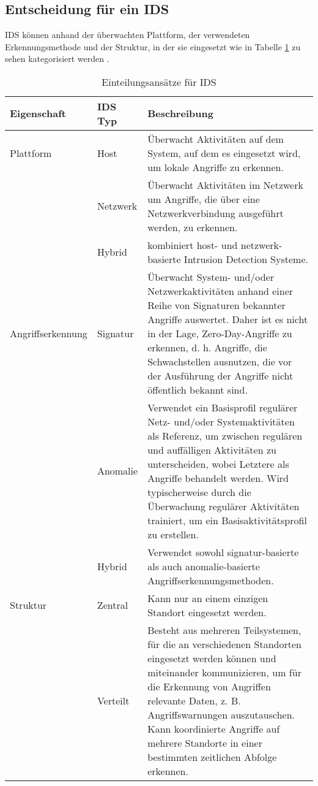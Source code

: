 \subsection{Entscheidung für ein IDS}
IDS können anhand der überwachten Plattform, der verwendeten Erkennungsmethode und der Struktur, in der sie eingesetzt wie in Tabelle \ref{Tabelle_1} zu sehen kategorisiert werden \cite{milenkoski_evaluating_2015}.
\begin{table}[H]
\label{Tabelle_1}
\caption{Einteilungsansätze für IDS}
\begin{tabularx}{\columnwidth}{p{3cm} l p{10cm}}
\toprule
Eigenschaft 
& IDS Typ 
& Beschreibung\\
\midrule
Plattform   
& Host     
& Überwacht Aktivitäten auf dem System, auf dem es eingesetzt wird, um lokale Angriffe zu erkennen.\\\addlinespace[0.5em]
& Netzwerk 
& Überwacht Aktivitäten im Netzwerk um Angriffe, die über eine Netzwerkverbindung ausgeführt werden, zu erkennen.\\ 
& Hybrid   
& kombiniert host- und netzwerk-basierte Intrusion Detection Systeme.\\
\midrule
Angriffserkennung 
& Signatur        
& Überwacht System- und/oder Netzwerkaktivitäten anhand einer Reihe von Signaturen bekannter Angriffe auswertet. Daher ist es nicht in der Lage, Zero-Day-Angriffe zu erkennen, d. h. Angriffe, die Schwachstellen ausnutzen, die vor der Ausführung der Angriffe nicht öffentlich bekannt sind.\\\addlinespace[0.5em]
& Anomalie        
& Verwendet ein Basisprofil regulärer Netz- und/oder Systemaktivitäten als Referenz, um zwischen regulären und auffälligen Aktivitäten zu unterscheiden, wobei Letztere als Angriffe behandelt werden. Wird typischerweise durch die Überwachung regulärer Aktivitäten trainiert, um ein Basisaktivitätsprofil zu erstellen.\\\addlinespace[0.5em]
& Hybrid          
& Verwendet sowohl signatur-basierte als auch anomalie-basierte Angriffserkennungsmethoden.\\ 
\midrule
Struktur
& Zentral
& Kann nur an einem einzigen Standort eingesetzt werden.\\\addlinespace[0.5em]
& Verteilt
& Besteht aus mehreren Teilsystemen, für die an verschiedenen Standorten eingesetzt werden können und miteinander kommunizieren, um für die Erkennung von Angriffen relevante Daten, z. B. Angriffswarnungen auszutauschen. Kann koordinierte Angriffe auf mehrere Standorte in einer bestimmten zeitlichen Abfolge erkennen.\\
\bottomrule
\end{tabularx}
\end{table}

